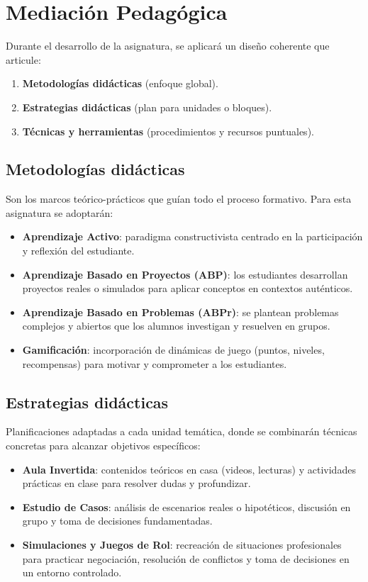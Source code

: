 \section{Mediación Pedagógica}
Durante el desarrollo de la asignatura, se aplicará un diseño coherente que articule:
\begin{enumerate}[leftmargin=*, itemsep=0.6em]
    \item \textbf{Metodologías didácticas} (enfoque global).
    \item \textbf{Estrategias didácticas} (plan para unidades o bloques).
    \item \textbf{Técnicas y herramientas} (procedimientos y recursos puntuales).
\end{enumerate}

\subsection*{Metodologías didácticas}
Son los marcos teórico-prácticos que guían todo el proceso formativo. Para esta asignatura se adoptarán:
\begin{itemize}[leftmargin=*, itemsep=0.6em]
    \item \textbf{Aprendizaje Activo}: paradigma constructivista centrado en la participación y reflexión del estudiante.
    \item \textbf{Aprendizaje Basado en Proyectos (ABP)}: los estudiantes desarrollan proyectos reales o simulados para aplicar conceptos en contextos auténticos.
    \item \textbf{Aprendizaje Basado en Problemas (ABPr)}: se plantean problemas complejos y abiertos que los alumnos investigan y resuelven en grupos.
    \item \textbf{Gamificación}: incorporación de dinámicas de juego (puntos, niveles, recompensas) para motivar y comprometer a los estudiantes.
\end{itemize}

\subsection*{Estrategias didácticas}
Planificaciones adaptadas a cada unidad temática, donde se combinarán técnicas concretas para alcanzar objetivos específicos:
\begin{itemize}[leftmargin=*, itemsep=0.6em]
    \item \textbf{Aula Invertida}: contenidos teóricos en casa (videos, lecturas) y actividades prácticas en clase para resolver dudas y profundizar.
    \item \textbf{Estudio de Casos}: análisis de escenarios reales o hipotéticos, discusión en grupo y toma de decisiones fundamentadas.
    \item \textbf{Simulaciones y Juegos de Rol}: recreación de situaciones profesionales para practicar negociación, resolución de conflictos y toma de decisiones en un entorno controlado.
\end{itemize}

